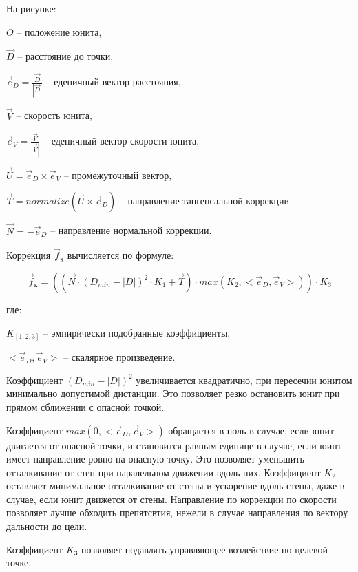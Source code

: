 На рисунке:

$O$ -- положение юнита,

$\vec D$ -- расстояние до точки,

$\vec e_D = \frac{\vec D}{|\vec D|}$ -- еденичный вектор расстояния,

$\vec V$ -- скорость юнита,

$\vec e_V = \frac{\vec V}{|\vec V|}$ -- еденичный вектор скорости юнита,

$\vec U = \vec e_D \times \vec e_V$ -- промежуточный вектор,

$\vec T = normalize(\vec U \times \vec e_D)$ -- направление тангенсальной коррекции

$\vec N = -\vec e_D$ -- направление нормальной коррекции.

\newpage
Коррекция $\vec f_{\text{к}}$ вычисляется по формуле:

$$\vec f_{\text{к}} = ( ( \vec N \cdot ( D_{min} - |D| )^2 \cdot K_1 + \vec T ) \cdot max( K_2, < \vec e_D, \vec e_V > ) ) \cdot K_3 $$

где:

$K_{[1,2,3]}$ -- эмпирически подобранные коэффициенты, 

$< \vec e_D, \vec e_V >$ -- скалярное произведение.

Коэффициент $(D_{min} - |D|)^2$ увеличивается квадратично,
при пересечии юнитом минимально допустимой дистанции. Это позволяет
резко остановить юнит при прямом сближении с опасной точкой.

Коэффициент $max(0, < \vec e_D, \vec e_V > )$ обращается в ноль в случае,
если юнит двигается от опасной точки, и становится равным единице в случае,
если юинт имеет направление ровно на опасную точку. Это позволяет уменьшить
отталкивание от стен при паралельном движении вдоль них. Коэффициент $K_2$ оставляет
минимальное отталкивание от стены и ускорение вдоль стены, даже в случае, если
юнит движется от стены. Направление по коррекции по скорости позволяет лучше
обходить препятсвтия, нежели в случае направления по вектору дальности до цели.

Коэффициент $K_3$ позволяет подавлять управляющее воздействие по целевой \lb точке.
